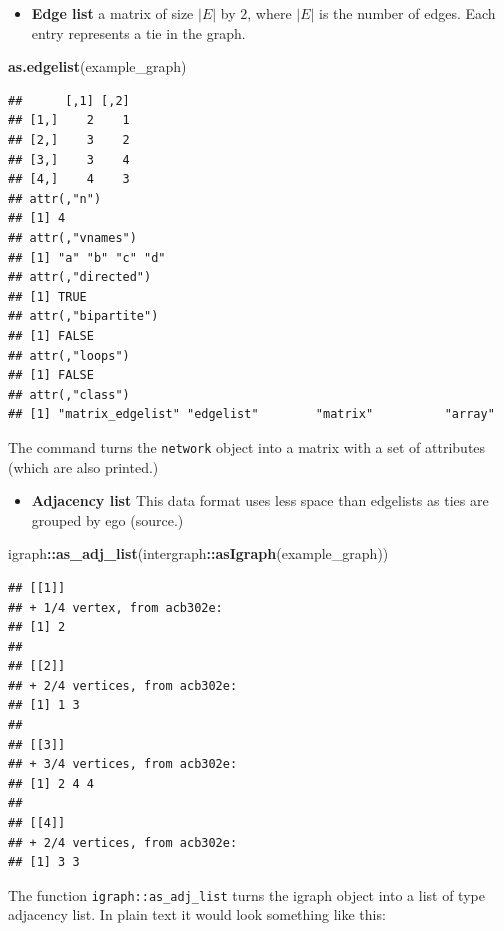 \documentclass[
]{book}
\newenvironment{Shaded}{\begin{snugshade}}{\end{snugshade}}
\newcommand{\FunctionTok}[1]{\textcolor[rgb]{0.13,0.29,0.53}{\textbf{#1}}}
\newcommand{\NormalTok}[1]{#1}
\newcommand{\SpecialCharTok}[1]{\textcolor[rgb]{0.81,0.36,0.00}{\textbf{#1}}}
\providecommand{\tightlist}{%
  \setlength{\itemsep}{0pt}\setlength{\parskip}{0pt}}
\begin{document}
\begin{itemize}
\tightlist
\item
  \textbf{Edge list} a matrix of size \(|E|\) by \(2\), where \(|E|\) is the number of edges.
  Each entry represents a tie in the graph.
\end{itemize}

\begin{Shaded}
\begin{Highlighting}[]
\FunctionTok{as.edgelist}\NormalTok{(example\_graph)}
\end{Highlighting}
\end{Shaded}

\begin{verbatim}
##      [,1] [,2]
## [1,]    2    1
## [2,]    3    2
## [3,]    3    4
## [4,]    4    3
## attr(,"n")
## [1] 4
## attr(,"vnames")
## [1] "a" "b" "c" "d"
## attr(,"directed")
## [1] TRUE
## attr(,"bipartite")
## [1] FALSE
## attr(,"loops")
## [1] FALSE
## attr(,"class")
## [1] "matrix_edgelist" "edgelist"        "matrix"          "array"
\end{verbatim}

The command turns the \texttt{network} object into a matrix with a set of attributes
(which are also printed.)

\begin{itemize}
\tightlist
\item
  \textbf{Adjacency list} This data format uses less space than edgelists as ties are
  grouped by ego (source.)
\end{itemize}

\begin{Shaded}
\begin{Highlighting}[]
\NormalTok{igraph}\SpecialCharTok{::}\FunctionTok{as\_adj\_list}\NormalTok{(intergraph}\SpecialCharTok{::}\FunctionTok{asIgraph}\NormalTok{(example\_graph)) }
\end{Highlighting}
\end{Shaded}

\begin{verbatim}
## [[1]]
## + 1/4 vertex, from acb302e:
## [1] 2
## 
## [[2]]
## + 2/4 vertices, from acb302e:
## [1] 1 3
## 
## [[3]]
## + 3/4 vertices, from acb302e:
## [1] 2 4 4
## 
## [[4]]
## + 2/4 vertices, from acb302e:
## [1] 3 3
\end{verbatim}

The function \texttt{igraph::as\_adj\_list} turns the igraph object into a list of
type adjacency list. In plain text it would look something like this:
\end{document}

